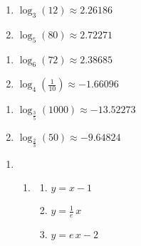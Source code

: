 \begin{multicols}{2}
\begin{enumerate}
\setcounter{enumi}{\value{HW}}

\item $\log_{3}(12) \approx 2.26186$
\item $\log_{5}(80) \approx 2.72271$

\setcounter{HW}{\value{enumi}}
\end{enumerate}
\end{multicols}

\begin{multicols}{2}
\begin{enumerate}
\setcounter{enumi}{\value{HW}}

\item $\log_{6}(72) \approx 2.38685$
\item $\log_{4}\left(\frac{1}{10}\right) \approx -1.66096$

\setcounter{HW}{\value{enumi}}
\end{enumerate}
\end{multicols}

\begin{multicols}{2}
\begin{enumerate}
\setcounter{enumi}{\value{HW}}
\item $\log_{\frac{3}{5}}(1000) \approx -13.52273$
\item $\log_{\frac{2}{3}}(50) \approx -9.64824$

\setcounter{HW}{\value{enumi}}
\end{enumerate}
\end{multicols}


\begin{enumerate}
\setcounter{enumi}{\value{HW}}

\addtocounter{enumi}{7}

\item   \begin{enumerate} \addtocounter{enumii}{3}  \item \begin{multicols}{3} \begin{enumerate}

\item  $y = x - 1$

\item  $y = \frac{1}{e} \, x$

\item $y = e \, x -2$

\end{enumerate}

\end{multicols}

\end{enumerate}

\setcounter{HW}{\value{enumi}}
\end{enumerate}
